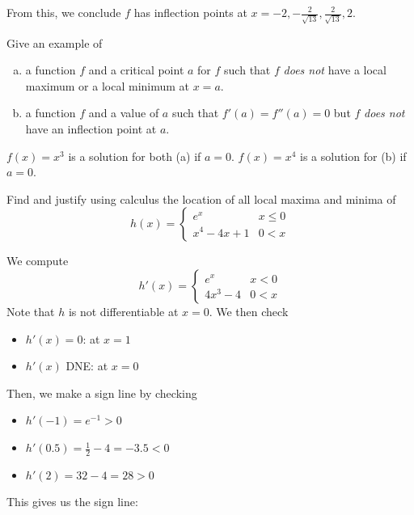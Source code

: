 \documentclass[11pt]{exam}
\begin{document}
\begin{questions}
\begin{solution}
\begin{enumerate}[(a)]
From this, we conclude \(f\) has inflection points at \(x=-2,-\frac{2}{\sqrt{13}},\frac{2}{\sqrt{13}},2\).
      \end{enumerate}
    \end{solution}
   \question Give an example of
\begin{enumerate}[(a)]
	\item a function $f$ and a critical point $a$ for $f$ such that $f$ \emph{does not} have a local maximum or a local minimum at $x=a$.
	\item a function $f$ and a value of $a$ such that $f'(a)=f''(a)=0$ but $f$ \emph{does not} have an inflection point at $a$.
\end{enumerate}
\begin{solution}
  \(f(x) = x^3\) is a solution for both (a) if \(a=0\). \(f(x) = x^4\)
  is a solution for (b) if \(a=0\).
\end{solution}
   \question Find and justify using calculus the location of all local maxima and minima of $$h(x)= \left\{
\begin{array}{ll}
      e^x & x\leq 0 \\
      x^4-4x+1& 0 < x %
\end{array} 
\right.
$$ 
\begin{solution}
  We compute \[
    h'(x) =
    \begin{cases}
      e^x & x < 0\\
      4x^3 - 4 & 0 < x
    \end{cases}
  \]
  Note that \(h\) is not differentiable at \(x=0\).
  We then check
  \begin{itemize}
  \item \(h'(x) = 0\): at \(x=1\)
  \item \(h'(x)\) DNE: at \(x=0\)
  \end{itemize}
  Then, we make a sign line by checking
  \begin{itemize}
  \item \(h'(-1) = e^{-1} > 0\)
  \item \(h'(0.5) = \frac{1}{2}-4 = -3.5 < 0\)
  \item \(h'(2) = 32-4 = 28 > 0\)
  \end{itemize}
  This gives us the sign line:


\end{solution}
\end{questions}
\end{document}

